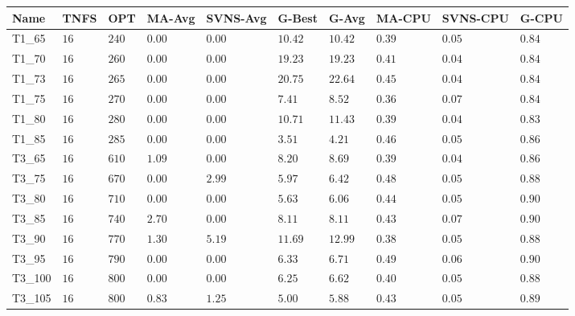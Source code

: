 \begin{center}
    \begin{table}[]
    \centering
    \begin{adjustwidth}{-0.4in}{-1in}
    \begin{tabular}{|lll|l|l|ll|lll|}
\hline
Name     & TNFS   & OPT    & MA-Avg   &SVNS-Avg& G-Best  & G-Avg   & MA-CPU   & SVNS-CPU   & G-CPU \\
\hline
T1\_65   & $16  $ & $240 $ & $\bm{0.00}  $ & $\bm{0.00}$ & $10.42$ & $10.42$ & $0.39  $ & $0.05    $ & $0.84     $ \\
T1\_70   & $16  $ & $260 $ & $\bm{0.00}  $ & $\bm{0.00}$ & $19.23$ & $19.23$ & $0.41  $ & $0.04    $ & $0.84     $ \\
T1\_73   & $16  $ & $265 $ & $\bm{0.00}  $ & $\bm{0.00}$ & $20.75$ & $22.64$ & $0.45  $ & $0.04    $ & $0.84     $ \\
T1\_75   & $16  $ & $270 $ & $\bm{0.00}  $ & $\bm{0.00}$ & $7.41 $ & $8.52 $ & $0.36  $ & $0.07    $ & $0.84     $ \\
T1\_80   & $16  $ & $280 $ & $\bm{0.00}  $ & $\bm{0.00}$ & $10.71$ & $11.43$ & $0.39  $ & $0.04    $ & $0.83     $ \\
T1\_85   & $16  $ & $285 $ & $\bm{0.00}  $ & $\bm{0.00}$ & $3.51 $ & $4.21 $ & $0.46  $ & $0.05    $ & $0.86     $ \\
\hline
T3\_65   & $16  $ & $610 $ & $1.09  $ & $\bm{0.00}$ & $8.20 $ & $8.69 $ & $0.39  $ & $0.04    $ & $0.86     $ \\
T3\_75   & $16  $ & $670 $ & $\bm{0.00}  $ & $2.99$ & $5.97 $ & $6.42 $ & $0.48  $ & $0.05    $ & $0.88     $ \\
T3\_80   & $16  $ & $710 $ & $\bm{0.00}  $ & $\bm{0.00}$ & $5.63 $ & $6.06 $ & $0.44  $ & $0.05    $ & $0.90     $ \\
T3\_85   & $16  $ & $740 $ & $2.70  $ & $\bm{0.00}$ & $8.11 $ & $8.11 $ & $0.43  $ & $0.07    $ & $0.90     $ \\
T3\_90   & $16  $ & $770 $ & $1.30  $ & $5.19$ & $11.69$ & $12.99$ & $0.38  $ & $0.05    $ & $0.88     $ \\
T3\_95   & $16  $ & $790 $ & $\bm{0.00}  $ & $\bm{0.00}$ & $6.33 $ & $6.71 $ & $0.49  $ & $0.06    $ & $0.90     $ \\
T3\_100  & $16  $ & $800 $ & $\bm{0.00}  $ & $\bm{0.00}$ & $6.25 $ & $6.62 $ & $0.40  $ & $0.05    $ & $0.88     $ \\
T3\_105  & $16  $ & $800 $ & $0.83  $ & $1.25$ & $5.00 $ & $5.88 $ & $0.43  $ & $0.05    $ & $0.89     $ \\

\end{tabular}
\end{adjustwidth}
\end{table}
\end{center}
